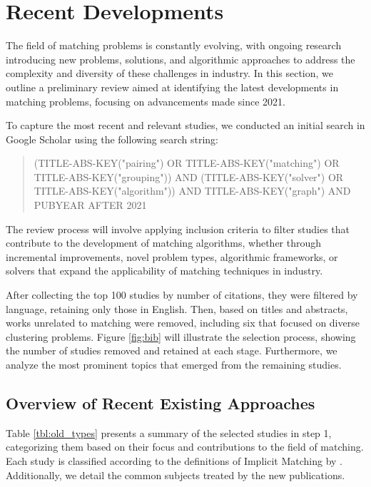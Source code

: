        

    \section{Recent Developments}
    
    The field of matching problems is constantly evolving, with ongoing research introducing new problems, solutions, and algorithmic approaches to address the complexity and diversity of these challenges in industry. In this section, we outline a preliminary review aimed at identifying the latest developments in matching problems, focusing on advancements made since 2021.
    
    To capture the most recent and relevant studies, we conducted an initial search in Google Scholar using the following search string:
    
    \begin{quote}
    (TITLE-ABS-KEY("pairing") OR TITLE-ABS-KEY("matching") OR TITLE-ABS-KEY("grouping")) AND (TITLE-ABS-KEY("solver") OR TITLE-ABS-KEY("algorithm")) AND TITLE-ABS-KEY("graph") AND PUBYEAR AFTER 2021
    \end{quote}
    
    The review process will involve applying inclusion criteria to filter studies that contribute to the development of matching algorithms, whether through incremental improvements, novel problem types, algorithmic frameworks, or solvers that expand the applicability of matching techniques in industry.
    
    After collecting the top 100 studies by number of citations, they were filtered by language, retaining only those in English. Then, based on titles and abstracts, works unrelated to matching were removed, including six that focused on diverse clustering problems.  Figure \ref{fig:bib} will illustrate the selection process, showing the number of studies removed and retained at each stage. Furthermore, we analyze the most prominent topics that emerged from the remaining studies.
    
    
    
    \subsection{Overview of Recent Existing Approaches}
    Table \ref{tbl:old_types} presents a summary of the selected studies in step 1, categorizing them based on their focus and contributions to the field of matching. Each study is classified according to the definitions of Implicit Matching by \cite{ieee_survey}. Additionally, we detail the common subjects treated by the new publications.

